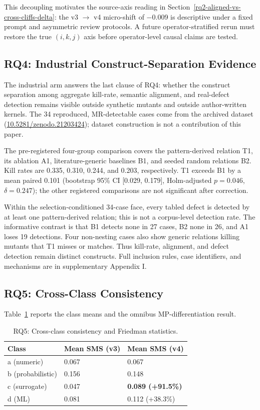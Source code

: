 \documentclass[manuscript,screen,review]{acmart}
\begin{document}
This decoupling motivates the source-axis reading in
Section~\ref{rq2-aligned-vs-cross-cliffs-delta}: the v3 $\to$ v4
micro-shift of $-$0.009 is descriptive under a fixed prompt and asymmetric
review protocols. A future operator-stratified rerun must restore the
true \((i,k,j)\) axis before operator-level causal claims are tested.

\subsection{RQ4: Industrial Construct-Separation Evidence}\label{rq4-industrial-construct-separation}

The industrial arm answers the last clause of RQ4: whether the
construct separation among aggregate kill-rate, semantic alignment, and
real-defect detection remains visible outside synthetic mutants and
outside author-written kernels. The 34 reproduced, MR-detectable cases
come from the archived dataset \citep{defect4mr2026}
(\href{https://doi.org/10.5281/zenodo.21203424}{10.5281/zenodo.21203424});
dataset construction is not a contribution of this paper.

The pre-registered four-group comparison covers the pattern-derived
relation T1, its ablation A1, literature-generic baselines B1, and seeded
random relations B2. Kill rates are 0.335, 0.310, 0.244, and 0.203,
respectively. T1 exceeds B1 by a mean paired 0.101 (bootstrap 95\% CI
[0.029, 0.179], Holm-adjusted \(p=0.046\), \(\delta=0.247\)); the other
registered comparisons are not significant after correction.

Within the selection-conditioned 34-case face, every tabled defect is
detected by at least one pattern-derived relation; this is not a
corpus-level detection rate. The informative contrast is that B1
detects none in 27 cases, B2 none in 26, and A1 loses 19 detections.
Four non-nesting cases also show generic relations killing mutants that
T1 misses or matches. Thus kill-rate, alignment, and defect detection
remain distinct constructs. Full inclusion rules, case identifiers, and
mechanisms are in supplementary Appendix I.

\subsection{RQ5: Cross-Class Consistency}\label{rq3-cross-class-consistency-and-friedman}

Table~\ref{tab:p2-12} reports the class means and the omnibus
MP-differentiation result.
{%
\begin{longtable}[]{@{}lll@{}}
\caption{RQ5: Cross-class consistency and Friedman statistics.}\label{tab:p2-12}\\
\toprule\noalign{}
Class & Mean SMS (v3) & Mean SMS (v4) \\
\midrule\noalign{}
\endfirsthead
\endhead
\bottomrule\noalign{}
\endlastfoot
a (numeric) & 0.067 & 0.067 \\
b (probabilistic) & 0.156 & 0.148 \\
c (surrogate) & 0.047 & \textbf{0.089 (+91.5\%)} \\
d (ML) & 0.081 & 0.112 (+38.3\%) \\
\end{longtable}
}
\end{document}
